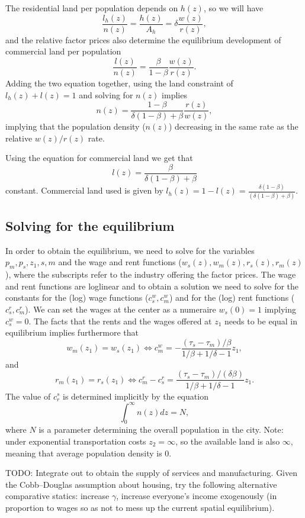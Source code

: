 \documentclass[10pt]{article}
\begin{document}
The residential land per population depends on $h(z)$, so we will have
\begin{equation*}
\frac{l_h(z)}{n(z)}=\frac{h(z)}{A_h}=\delta\frac{w(z)}{r(z)},
\end{equation*}
and the relative factor prices also determine the equilibrium development of commercial land per population
\begin{equation*}
\frac{l(z)}{n(z)}=\frac{\beta}{1-\beta}\frac{w(z)}{r(z)}. 
\end{equation*}
Adding the two equation together, using the land constraint of $l_h(z)+l(z)=1$ and solving for $n(z)$ implies
\begin{equation}
n(z)=\frac{1-\beta}{\delta(1-\beta)+\beta}\frac{r(z)}{w(z)},
\end{equation}
implying that the population density ($n(z)$) decreasing in the same rate as the relative $w(z)/r(z)$ rate. 

Using the equation for commercial land we get that 
\begin{equation}
l(z)=\frac{\beta}{\delta(1-\beta)+\beta}
\end{equation}
constant. Commercial land used is given by $l_h(z)=1-l(z)=\frac{\delta(1-\beta)}{(\delta(1-\beta)+\beta)}$. 

\subsection{Solving for the equilibrium}
In order to obtain the equilibrium, we need to solve for the variables $p_m,p_s,z_1,s,m$ and the wage and rent functions ($w_s(z),w_m(z),r_s(z),r_m(z)$), where the subscripts refer to the industry offering the factor prices. The wage and rent functions are loglinear and to obtain a solution we need to solve for the constants for the (log) wage functions ($c^w_s,c^w_m$) and for the (log) rent functions ($c^r_s, c^r_m$). We can set the wages at the center as a numeraire $w_s(0)=1$ implying $c^w_s=0$. The facts that the rents and the wages offered at $z_1$ needs to be equal in equilibrium implies furthermore that
\begin{equation*}
w_m(z_1)=w_s(z_1) \Leftrightarrow c^w_m=-\frac{(\tau_s-\tau_m)/\beta}{1/\beta+1/\delta-1}z_1,
\end{equation*}
and 
\begin{equation*}
r_m(z_1)=r_s(z_1) \Leftrightarrow c^r_m-c^r_s=\frac{(\tau_s-\tau_m)/(\delta\beta)}{1/\beta+1/\delta-1}{z_1}.
\end{equation*}
The value of $c_r^s$ is determined implicitly by the equation
\begin{equation*}
\int_0^\infty n(z)dz=N,
\end{equation*}
where $N$ is a parameter determining the overall population in the city. Note: under exponential transportation costs $z_2=\infty$, so the available land is also $\infty$, meaning that average population density is 0.



TODO: Integrate out to obtain the supply of services and manufacturing. Given the Cobb--Douglas assumption about housing, try the following alternative comparative statics: increase $\gamma$, increase everyone's income exogenously (in proportion to wages so as not to mess up the current spatial equilibrium).
\end{document}
